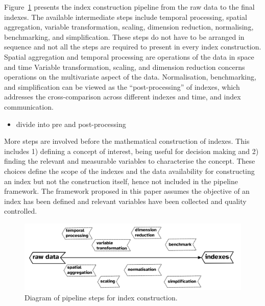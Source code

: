\documentclass[
]{article}
\providecommand{\tightlist}{%
  \setlength{\itemsep}{0pt}\setlength{\parskip}{0pt}}\usepackage{longtable,booktabs,array}
\begin{document}
Figure~\ref{fig-pipeline-steps} presents the index construction pipeline
from the raw data to the final indexes. The available intermediate steps
include temporal processing, spatial aggregation, variable
transformation, scaling, dimension reduction, normalising, benchmarking,
and simplification. These steps do not have to be arranged in sequence
and not all the steps are required to present in every index
construction. Spatial aggregation and temporal processing are operations
of the data in space and time Variable transformation, scaling, and
dimension reduction concerns operations on the multivariate aspect of
the data. Normalisation, benchmarking, and simplification can be viewed
as the ``post-processing'' of indexes, which addresses the
cross-comparison across different indexes and time, and index
communication.

\begin{itemize}
\tightlist
\item
  divide into pre and post-processing
\end{itemize}

More steps are involved before the mathematical construction of indexes.
This includes 1) defining a concept of interest, being useful for
decision making and 2) finding the relevant and measurable variables to
characterise the concept. These choices define the scope of the indexes
and the data availability for constructing an index but not the
construction itself, hence not included in the pipeline framework. The
framework proposed in this paper assumes the objective of an index has
been defined and relevant variables have been collected and quality
controlled.

\begin{figure}

{\centering \includegraphics[width=1\textwidth,height=0.9\textheight]{../figures/pipeline-steps.png}

}

\caption{\label{fig-pipeline-steps}Diagram of pipeline steps for index
construction.}

\end{figure}
\end{document}
